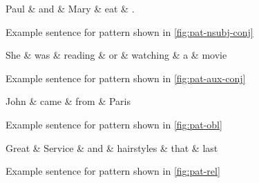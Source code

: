\documentclass[11pt,a4paper]{article}
\begin{document}
\begin{figure}[h]
    \centering
    \begin{dependency}
    \begin{deptext}[column sep=1em]
    Paul \& and \& Mary \& eat \& . \\
    \end{deptext}
    \end{dependency}
    \caption{Example sentence for pattern shown in \cref{fig:pat-nsubj-conj}}
    \label{fig:paul-and-mary}
\end{figure}

\begin{figure}[h]
    \centering
    \begin{dependency}
    \begin{deptext}[column sep=0.1cm]
    She \& was \& reading \& or \& watching \& a \& movie  \\
    \end{deptext}
    \end{dependency}
    \caption{Example sentence for pattern shown in \cref{fig:pat-aux-conj}}
    \label{fig:reading-or-watching}
\end{figure}

\begin{figure}[h]
    \centering
    \begin{dependency}
    \begin{deptext}[column sep=1em]
    John \& came \& from \& Paris  \\
    \end{deptext}
  \end{dependency}
  \caption{Example sentence for pattern shown in \cref{fig:pat-obl}}
  \label{fig:john-paris}
\end{figure}




\begin{figure}[h]
    \centering
    \begin{dependency}
    \begin{deptext}[column sep=0.1cm]
    Great \& Service \& and \& hairstyles \& that \& last  \\
    \end{deptext}
    \end{dependency}
    \caption{Example sentence for pattern shown in \cref{fig:pat-rel}}
    \label{fig:aclrecl}
\end{figure}
    
\end{document}
